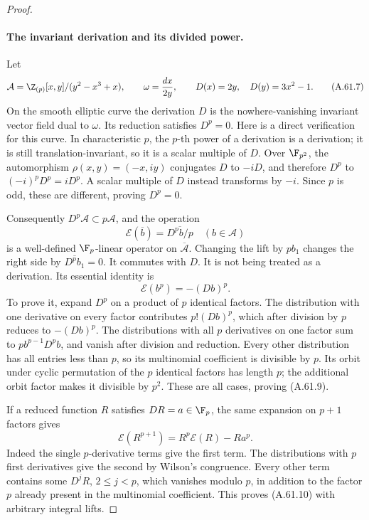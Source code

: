 \begin{proof}
\paragraph{The invariant derivation and its divided power.}
Let
\[
 \mathcal A=\Z_{(p)}[x,y]/(y^2-x^3+x),\qquad
 \omega=\frac{dx}{2y},\qquad
 D(x)=2y,\quad D(y)=3x^2-1.                            \tag{A.61.7}
\]
On the smooth elliptic curve the derivation \(D\) is
the nowhere-vanishing invariant vector field dual to
\(\omega\). Its reduction satisfies \(D^p=0\).
Here is a direct verification for this curve. In
characteristic \(p\), the \(p\)-th power of a derivation
is a derivation; it is still translation-invariant,
so it is a scalar multiple of \(D\). Over \(\F_{p^2}\),
the automorphism \(\rho(x,y)=(-x,iy)\) conjugates
\(D\) to \(-iD\), and therefore \(D^p\) to
\((-i)^pD^p=iD^p\). A scalar multiple of \(D\)
instead transforms by \(-i\). Since \(p\) is odd,
these are different, proving \(D^p=0\).

Consequently \(D^p\mathcal A\subset p\mathcal A\),
and the operation
\[
                \mathcal E(\overline b)
                  =\overline{D^p b/p}
                  \quad(b\in\mathcal A)               \tag{A.61.8}
\]
is a well-defined \(\F_p\)-linear operator on
\(\overline{\mathcal A}\). Changing the lift by
\(p b_1\) changes the right side by
\(\overline{D^p b_1}=0\). It commutes with \(D\).
It is not being treated as a derivation. Its essential
identity is
\[
                    \mathcal E(b^p)=-(Db)^p.           \tag{A.61.9}
\]
To prove it, expand \(D^p\) on a product of \(p\)
identical factors. The distribution with one derivative
on every factor contributes \(p!(Db)^p\), which after
division by \(p\) reduces to \(-(Db)^p\). The
distributions with all \(p\) derivatives on one factor
sum to \(p b^{p-1}D^p b\), and vanish after division
and reduction. Every other distribution has all entries
less than \(p\), so its multinomial coefficient is
divisible by \(p\). Its orbit under cyclic permutation
of the \(p\) identical factors has length \(p\);
the additional orbit factor makes it divisible by
\(p^2\). These are all cases, proving (A.61.9).

If a reduced function \(R\) satisfies \(DR=a\in\F_p\),
the same expansion on \(p+1\) factors gives
\[
 \mathcal E(R^{p+1})
       =R^p\mathcal E(R)-R a^p.                       \tag{A.61.10}
\]
Indeed the single \(p\)-derivative terms give the first
term. The distributions with \(p\) first derivatives
give the second by Wilson's congruence. Every other
term contains some \(D^jR\), \(2\le j<p\), which
vanishes modulo \(p\), in addition to the factor
\(p\) already present in the multinomial coefficient.
This proves (A.61.10) with arbitrary integral lifts.


\end{proof}
